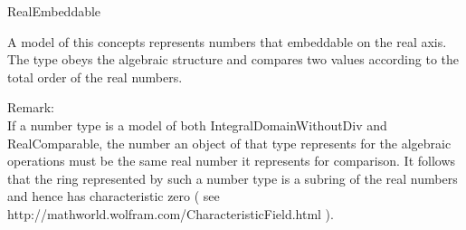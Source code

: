 \begin{ccRefConcept}{RealEmbeddable}

\ccDefinition

A model of this concepts represents numbers that embeddable on the real 
axis. The type obeys the algebraic structure and compares two values according 
to the total order of the real numbers.


Remark:\\
If a number type is a model of both IntegralDomainWithoutDiv and 
RealComparable, the number an object of that type represents for the 
algebraic operations must be the same real number it represents for 
comparison. It follows that the ring represented by such a number type 
is a subring of the real numbers and hence has characteristic zero 
( see http://mathworld.wolfram.com/CharacteristicField.html ).

\ccRefines
{}

\ccOperations
{}
\ccGlue
{}
\ccGlue
{}
\ccGlue
{}
\ccGlue



\ccSeeAlso

\\

\ccHasModels

\end{ccRefConcept}